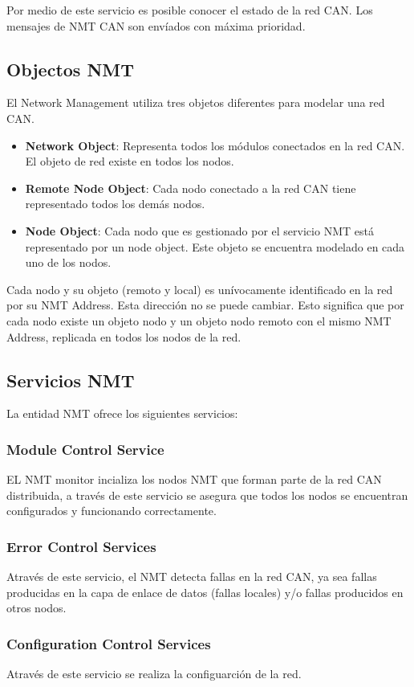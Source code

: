 Por medio de este servicio es posible conocer el estado de la red CAN. Los
mensajes de NMT CAN son envíados con máxima prioridad. 
\subsection{Objectos NMT}
El Network Management utiliza tres objetos diferentes para modelar una red CAN.
\begin{itemize}
 \item \textbf{Network Object}: Representa todos los módulos conectados en la
  red CAN. El objeto de red existe en todos los nodos.
 \item \textbf{Remote Node Object}: Cada nodo conectado a la red CAN tiene
   representado todos los demás nodos.    
 \item \textbf{Node Object}: Cada nodo que es gestionado por el servicio NMT
   está representado por un node object. Este objeto se encuentra modelado en
   cada uno de los nodos.    
 \end{itemize}
Cada nodo y su objeto (remoto y local) es unívocamente identificado en la red
por su NMT Address. Esta dirección no se puede cambiar. Esto significa que por
cada nodo existe un objeto nodo y un objeto nodo remoto con el mismo NMT
Address, replicada en todos los nodos de la red. 

\subsection{Servicios NMT}
La entidad NMT ofrece los siguientes servicios:
\subsubsection{Module Control Service}
EL NMT monitor incializa los nodos NMT que forman parte de la red CAN
distribuida, a través de este servicio se asegura que todos los nodos se
encuentran configurados y funcionando correctamente.
\subsubsection{Error Control Services}
Através de este servicio, el NMT detecta fallas en la red CAN, ya sea fallas
producidas en la capa de enlace de datos (fallas locales) y/o fallas
producidos en otros nodos.
\subsubsection{Configuration Control Services}
Através de este servicio se realiza la configuarción de la red.

